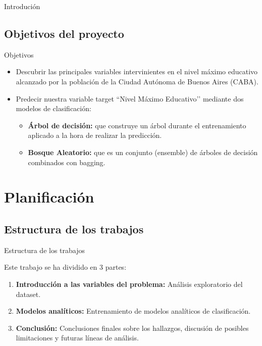\documentclass[pdf]{beamer}
\begin{document}
{\begin{frame}{Introdución}
\end{frame}

    \subsection{Objetivos del proyecto}

\begin{frame}{Objetivos}

    \begin{itemize}
        \justifying%
        \item Descubrir las principales variables intervinientes en el nivel máximo educativo alcanzado por la población de la Ciudad Autónoma de Buenos Aires (CABA).
        
        \item Predecir nuestra variable target ``Nivel Máximo Educativo’’ mediante dos modelos de clasificación:
        \begin{itemize}
            \justifying%
            \item \textbf{Árbol de decisión:} que construye un árbol durante el entrenamiento aplicado a la hora de realizar la predicción.
            \item \textbf{Bosque Aleatorio:} que es un conjunto (ensemble) de árboles de decisión combinados con bagging.
        \end{itemize}
    \end{itemize}

\end{frame}

\section{Planificación}

    \subsection*{Estructura de los trabajos}

\begin{frame}{Estructura de los trabajos}

    Este trabajo se ha dividido en 3 partes:
    \begin{enumerate}
        \justifying%
        \item \textbf{Introducción a las variables del problema:} Análisis exploratorio del dataset. 
        \item \textbf{Modelos analíticos:} Entrenamiento de modelos analíticos de clasificación.
        \item \textbf{Conclusión:} Conclusiones finales sobre los hallazgos, discusión de posibles limitaciones y futuras líneas de análisis.
        


\end{enumerate}
\end{frame}}
\end{document}

